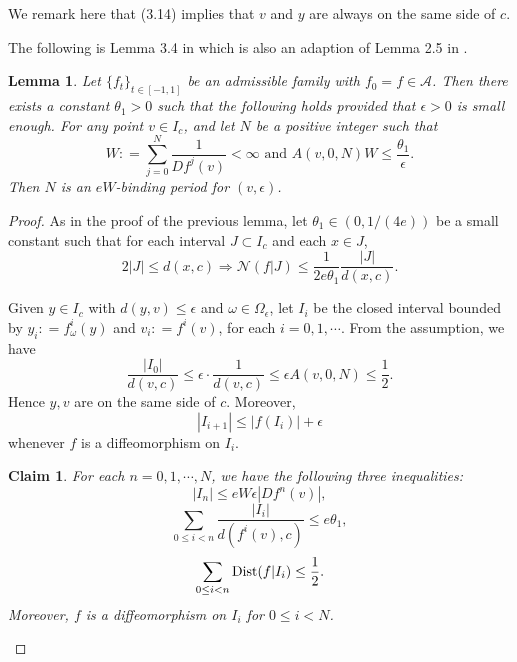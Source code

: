 \documentclass[11pt,oneside]{article}
\newtheorem*{claim}{Claim}
\theoremstyle{plain}
\newtheorem{lem}{Lemma}[section]
\numberwithin{equation}{section}
\numberwithin{figure}{section}
\numberwithin{table}{section}
\begin{document}
We remark here that (3.14) implies that $v$ and $y$ are always on the same side of $c$. 


The following is Lemma 3.4 in \cite{LR} which is also an adaption of Lemma 2.5 in \cite{S}.


\begin{lem}
Let $\{f_t \}_{t \in [-1, 1]} $ be an admissible family with $f_0 =f \in \mathcal A$. Then there exists a constant $\theta_1>0$ such that the following holds provided that $\epsilon >0$ is small enough. For any point $v \in I_c$, and let $N$ be a positive integer such that 
\[
W : = \sum_{j=0}^N \frac{1}{Df^j(v)} < \infty \text{ and } A(v, 0, N) W \leq \frac{\theta_1}{\epsilon}.
\]
Then $N$ is an $eW$-binding period for $(v, \epsilon)$.
\end{lem}

\iffalse
\begin{proof}

As in the proof of the previous lemma, let $\theta_1 \in (0, 1/(4e))$ be a small constant such that for each interval $J \subset I_c$ and each $x \in J$,
\begin{equation}
2|J| \leq d(x, c) \Longrightarrow \mathcal N(f|J) \leq  \frac{1}{2e\theta_1} \frac{|J|}{d(x, c)}.
\end{equation}

Given $y \in I_c$ with $d(y, v)\leq \epsilon$ and $\omega \in \Omega_{\epsilon}$, let $I_i$ be the closed interval bounded by $y_i : = f_{\omega}^i(y)$ and $v_i : = f^i(v)$, for each $i=0, 1, \cdots$. From the assumption, we have
\[
\frac{|I_0|}{d(v, c)} \leq \epsilon \cdot \frac{1}{d(v, c)} \leq \epsilon A(v, 0, N) \leq \frac{1}{2}.
\]
Hence $y, v$ are on the same side of $c$. Moreover,
\begin{equation}
|I_{i+1}| \leq |f(I_i)| + \epsilon
\end{equation}
whenever $f$ is a diffeomorphism on $I_i$.


\begin{claim}
For each $n=0, 1, \cdots, N$, we have the following three inequalities:
\begin{equation}
|I_n| \leq e W \epsilon |Df^n(v)|,
\end{equation}
\begin{equation}
\sum_{0 \leq i <n} \frac{|I_i|}{d(f^i(v), c)}\leq e \theta_1,
\end{equation}
\begin{equation}
\sum_{0 \leq i <n} {\rm Dist}(f | I_i) \leq \frac{1}{2}.
\end{equation}
Moreover, $f$ is a diffeomorphism on $I_i$ for $0 \leq i < N$.
\end{claim}



\end{proof}
\end{document}
